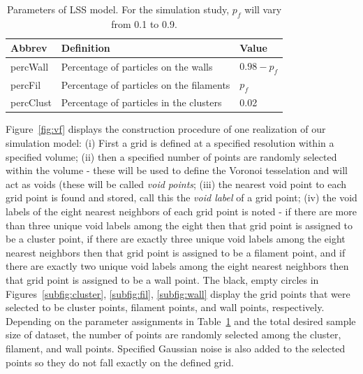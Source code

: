 \documentclass[12pt]{article}
\begin{document}
\begin{table}[htp!]
\begin{center}
\begin{tabular}{ l|l|l } 
Abbrev & Definition & Value \\ 
\hline
percWall & Percentage of particles on the walls & $0.98 - p_{f}$ \\ 
percFil & Percentage of particles on the filaments & $p_{f}$ \\ 
percClust & Percentage of particles in the clusters & 0.02 \\ 
\end{tabular}
\end{center}
\caption{Parameters of LSS model. For the simulation study, $p_{f}$ will vary from 0.1 to 0.9.}
\label{table:voronoisettings}
\end{table}


Figure~\ref{fig:vf} displays the construction procedure of one realization of our simulation model:  (i) First a grid is defined at a specified resolution within a specified volume; (ii) then a specified number of points are randomly selected within the volume - these will be used to define the Voronoi tesselation and will act as voids (these will be called \emph{void points}; (iii) the nearest void point to each grid point is found and stored, call this the \emph{void label} of a grid point; (iv) the void labels of the eight nearest neighbors of each grid point is noted - if there are more than three unique void labels among the eight then that grid point is assigned to be a cluster point, if there are exactly three unique void labels among the eight nearest neighbors then that grid point is assigned to be a filament point, and if there are exactly two unique void labels among the eight nearest neighbors then that grid point is assigned to be a wall point. The black, empty circles in Figures~\ref{subfig:cluster}, \ref{subfig:fil}, \ref{subfig:wall} display the grid points that were selected to be cluster points, filament points, and wall points, respectively.  Depending on the parameter assignments in Table~\ref{table:voronoisettings} and the total desired sample size of dataset, the number of points are randomly selected among the cluster, filament, and wall points.  Specified Gaussian noise is also added to the selected points so they do not fall exactly on the defined grid.
\end{document}
